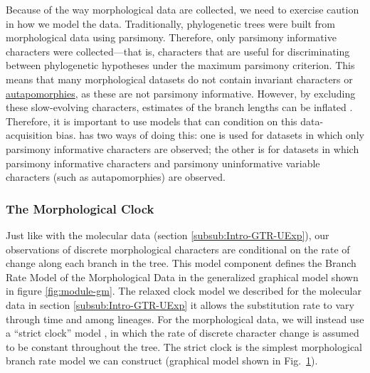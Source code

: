 Because of the way morphological data are collected, we need to exercise caution in how we model the data. 
Traditionally, phylogenetic trees were built from morphological data using parsimony. 
Therefore, only parsimony informative characters were collected---that is, characters that are useful for discriminating between phylogenetic hypotheses under the maximum parsimony criterion.
This means that many morphological datasets do not contain invariant characters or \href{https://en.wikipedia.org/wiki/Autapomorphy}{autapomorphies}, as these are not parsimony informative. 
However, by excluding these slow-evolving characters, estimates of the branch lengths can be inflated \citep{Felsenstein1992,Lewis2001}.
Therefore, it is important to use models that can condition on this data-acquisition bias. 
\RevBayes has two ways of doing this: one is used for datasets in which only parsimony informative characters are observed; the other is for datasets in which parsimony informative characters and parsimony uninformative variable characters (such as autapomorphies) are observed.


\subsubsection{The Morphological Clock}\label{subsub:Intro-MorphClock}



Just like with the molecular data (section \ref{subsub:Intro-GTR-UExp}), our observations of discrete morphological characters are conditional on the rate of change along each branch in the tree. 
This model component defines the \textsf{Branch Rate Model} of the \textsf{Morphological Data} in the generalized graphical model shown in figure \ref{fig:module-gm}.
The relaxed clock model we described for the molecular data in section \ref{subsub:Intro-GTR-UExp} it allows the substitution rate to vary through time and among lineages. 
For the morphological data, we will instead use a ``strict clock'' model \citep{Zuckerkandl1962}, in which the rate of discrete character change is assumed to be constant throughout the tree.
The strict clock is the simplest morphological branch rate model we can construct (graphical model shown in Fig.\ \ref{fig:morph_clock_gm}).
\begin{figure}[h!]
\label{fig:morph_clock_gm}
\end{figure} 


